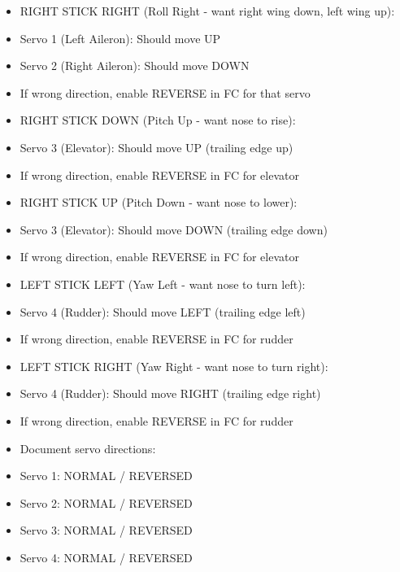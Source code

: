 \documentclass[11pt,letterpaper]{article}
\begin{document}
\begin{itemize}
  \item RIGHT STICK RIGHT (Roll Right - want right wing down, left wing up):
  \item Servo 1 (Left Aileron): Should move UP
  \item Servo 2 (Right Aileron): Should move DOWN
  \item If wrong direction, enable REVERSE in FC for that servo
\end{itemize}

\begin{itemize}
  \item RIGHT STICK DOWN (Pitch Up - want nose to rise):
  \item Servo 3 (Elevator): Should move UP (trailing edge up)
  \item If wrong direction, enable REVERSE in FC for elevator
\end{itemize}

\begin{itemize}
  \item RIGHT STICK UP (Pitch Down - want nose to lower):
  \item Servo 3 (Elevator): Should move DOWN (trailing edge down)
  \item If wrong direction, enable REVERSE in FC for elevator
\end{itemize}

\begin{itemize}
  \item LEFT STICK LEFT (Yaw Left - want nose to turn left):
  \item Servo 4 (Rudder): Should move LEFT (trailing edge left)
  \item If wrong direction, enable REVERSE in FC for rudder
\end{itemize}

\begin{itemize}
  \item LEFT STICK RIGHT (Yaw Right - want nose to turn right):
  \item Servo 4 (Rudder): Should move RIGHT (trailing edge right)
  \item If wrong direction, enable REVERSE in FC for rudder
\end{itemize}

\begin{itemize}
  \item Document servo directions:
  \item Servo 1: NORMAL / REVERSED
  \item Servo 2: NORMAL / REVERSED
  \item Servo 3: NORMAL / REVERSED
  \item Servo 4: NORMAL / REVERSED
\end{itemize}
\end{document}
